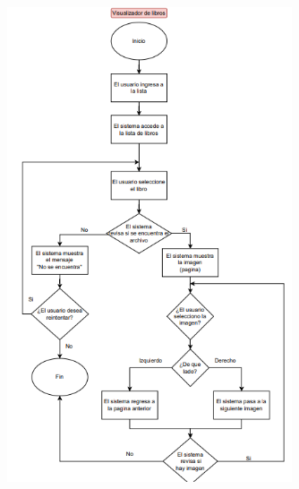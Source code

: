\documentclass[12pt]{article}
\begin{document}
\begin{figure}[htbp]
	\centering
		\includegraphics[width=0.75\textwidth]{Screenshot 2023-10-05 114707.png}
	\label{fig:Screenshot 2023-10-05 114707}
\end{figure}
\end{document}
